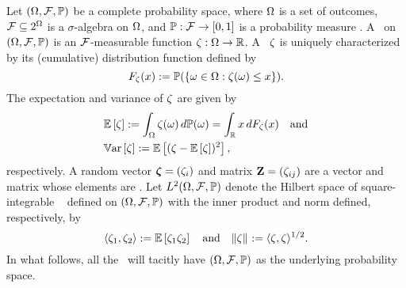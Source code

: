 Let $(\Omega, \mathcal{F}, \mathbb{P})$ be a complete probability space, where $\Omega$ is a set of outcomes, $\mathcal{F} \subseteq 2^\Omega$ is a $\sigma$-algebra on $\Omega$, and $\mathbb{P}: \mathcal{F} \to [0, 1]$ is a probability measure \cite{durrett2010}.
A \rv\ on $(\Omega, \mathcal{F}, \mathbb{P})$ is an $\mathcal{F}$-measurable function $\zeta: \Omega \to \mathbb{R}$.
A \rv\ $\zeta$ is uniquely characterized by its (cumulative) distribution function defined by
\begin{equation*}
  F_\zeta(x) := \mathbb{P}(\{ \omega \in \Omega: \zeta(\omega) \leq x \}).
\end{equation*}
The expectation and variance of $\zeta$ are given by
\begin{align*}
  & \mathbb{E}\left[ \zeta \right] := \int_\Omega \zeta(\omega) \, d\mathbb{P}(\omega) = \int_{\mathbb{R}} x \, d F_\zeta(x) \hspace{1em} \text{and} \\
  & \mathbb{V}\text{ar}\left[ \zeta \right] := \mathbb{E}\left[ (\zeta - \mathbb{E}\left[ \zeta \right])^2 \right],
\end{align*}
respectively.
A random vector $\bm{\zeta} = (\zeta_i)$ and matrix $\mathbf{Z} = (\zeta_{ij})$ are a vector and matrix whose elements are \rvs.
Let $L^{2}(\Omega, \mathcal{F}, \mathbb{P})$ denote the Hilbert space of square-integrable \rvs\ \cite{janson1997} defined on $(\Omega, \mathcal{F}, \mathbb{P})$ with the inner product and norm defined, respectively, by
\begin{equation*}
  \langle \zeta_1, \zeta_2 \rangle := \mathbb{E}\left[ \zeta_1 \zeta_2 \right] \hspace{1em} \text{and} \hspace{1em} \| \zeta \|_{} := \langle \zeta, \zeta \rangle^{1/2}.
\end{equation*}
In what follows, all the \rvs\ will tacitly have $(\Omega, \mathcal{F}, \mathbb{P})$ as the underlying probability space.
